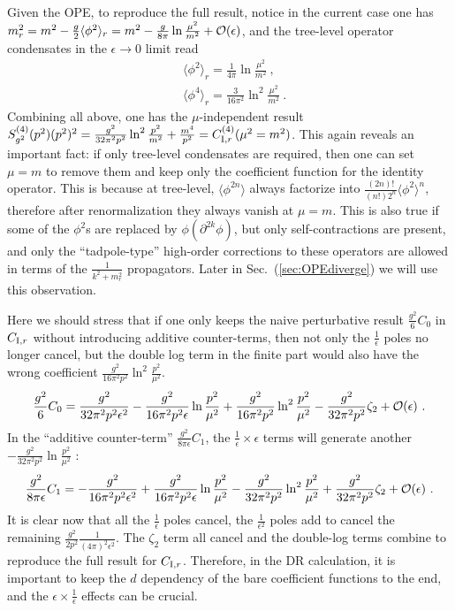 \documentclass[a4paper,11pt]{article}
\begin{document}
Given the OPE,  to reproduce the full result, notice in the current case one has $m_r^2=m^2-\frac{g}{2}\langle \phi^2\rangle_r=m^2-\frac{g}{8\pi}\ln \frac{\mu^2}{m^2}+{\cal O}(\epsilon)$, and the tree-level operator condensates in the $\epsilon \rightarrow 0$ limit read
\begin{align}
&\langle \phi^2\rangle_r=\frac{1}{4\pi}\ln \frac{\mu^2}{m^2} \ , \label{eq:treesquare} \\ 
&\langle \phi^4\rangle_r=\frac{3}{16\pi^2}\ln^2 \frac{\mu^2}{m^2}  \ . \label{eq:treequartic}
\end{align}
Combining all above, one has the $\mu$-independent result $S_{g^2}^{(4)}(p^2)(p^2)^2=\frac{g^2}{32\pi^2p^2}\ln^2 \frac{p^2}{m^2}+\frac{m^4}{p^2}=C_{{\rm I},r}^{(4)}(\mu^2=m^2)$. This again reveals an important fact: if only tree-level condensates are required, then one can set $\mu=m$ to remove them and keep only the coefficient function for the identity operator. This is because at tree-level, $\langle\phi^{2n}\rangle$ always factorize into $\frac{(2n)!}{(n!)2^n}\langle\phi^2\rangle^n$, therefore after renormalization they always vanish at $\mu=m$. This is also true if some of the $\phi^2$s are replaced by $\phi(\partial^{2k}\phi)$, but only self-contractions are present, and only the ``tadpole-type'' high-order corrections to these operators are allowed in terms of the $\frac{1}{k^2+m_r^2}$ propagators. Later in Sec.~(\ref{sec:OPEdiverge}) we will use this observation.


Here we should stress that if one only keeps the naive perturbative result $\frac{g^2}{6}C_0$ in $C_{{\rm I}, r}$ without introducing additive counter-terms, then not only the $\frac{1}{\epsilon}$ poles no longer cancel, but the double log term in the finite part would also have the wrong coefficient $\frac{g^2}{16\pi^2p^2}\ln^2\frac{p^2}{\mu^2}$.
\begin{align}
\frac{g^2}{6}C_0=\frac{g^2}{32 \pi ^2 p^2 \epsilon^2}-\frac{g^2}{16 \pi ^2 p^2 \epsilon }\ln\frac{p^2}{\mu^2}+\frac{ g^2}{16\pi ^2 p^2}\ln^2\frac{p^2}{\mu^2}-\frac{g^2}{32 \pi^2p^2}\zeta_2+{\cal O}(\epsilon) \ .
\end{align}
In the ``additive counter-term'' $\frac{g^2}{8\pi \epsilon}C_1$, the $\frac{1}{\epsilon}\times \epsilon$ terms will generate another $-\frac{g^2}{32\pi^2p^2}\ln \frac{p^2}{\mu^2}$ :
\begin{align}
\frac{g^2}{8\pi \epsilon}C_1=-\frac{g^2}{16\pi^2 p^2\epsilon^2}+\frac{g^2}{16 \pi ^2 p^2 \epsilon }\ln\frac{p^2}{\mu^2}-\frac{g^2}{32\pi^2p^2}\ln^2\frac{p^2}{\mu^2}+\frac{g^2}{32\pi^2p^2}\zeta_2+{\cal O}(\epsilon) \ .
\end{align}
It is clear now that all the $\frac{1}{\epsilon}$ poles cancel, the $\frac{1}{\epsilon^2}$ poles add to cancel the remaining $\frac{g^2}{2p^2}\frac{1}{(4\pi)^2\epsilon^2}$. The $\zeta_2$ term all cancel and the double-log terms combine to reproduce the full result for $C_{{\rm I},r}$. Therefore, in the DR calculation, it is important to keep the $d$ dependency of the bare coefficient functions to the end, and the $\epsilon \times \frac{1}{\epsilon}$ effects can be crucial. 
\end{document}
